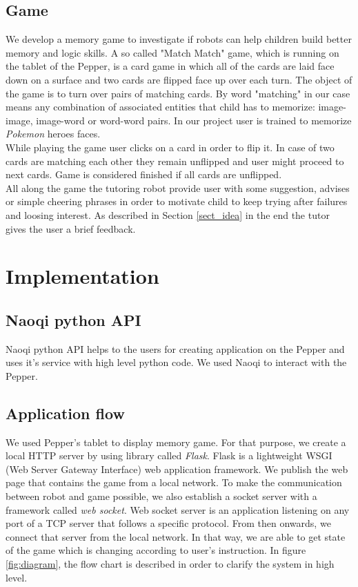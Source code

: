 \documentclass[12pt]{article}
\begin{document}
\subsection{Game}
\label{sect_game_descr}
We develop a memory game to investigate if robots can help children build better memory and logic skills. A so called "Match Match" game, which is running on the tablet of the Pepper, is a card game in which all of the cards are laid face down on a surface and two cards are flipped face up over each turn. The object of the game is to turn over pairs of matching cards. By word "matching" in our case means any combination of associated entities that child has to memorize: image-image, image-word or word-word pairs. In our project user is trained to memorize \textit{Pokemon} heroes faces.
\\
While playing the game user clicks on a card in order to flip it. In case of two cards are matching each other they remain unflipped and user might proceed to next cards. Game is considered finished if all cards are unflipped.
\\
All along the game the tutoring robot provide user with some suggestion,  advises or simple cheering phrases in order to motivate child to keep trying after failures and loosing interest. As described in Section \ref{sect_idea} in the end the tutor gives the user a brief feedback.
\newpage
\section{Implementation}
\subsection{Naoqi python API}
Naoqi python API helps to the users for creating application on the Pepper and uses it's service with high level python code. We used Naoqi to interact with the Pepper.
\subsection{Application flow}
We used Pepper's tablet to display memory game. For that purpose, we create a local HTTP server by using library called \textit{Flask}. Flask is a lightweight WSGI (Web Server Gateway Interface) web application framework. We publish the web page that contains the game from a local network. To make the communication between robot and game possible, we also establish a socket server with a framework called \textit{web socket}. Web socket server is an application listening on any port of a TCP server that follows a specific protocol. From then onwards,  we connect that server from the local network. In that way, we are able to get state of the game which is changing according to user's instruction. In figure \ref{fig:diagram}, the flow chart is described in order to clarify the system in high level.
\end{document}
